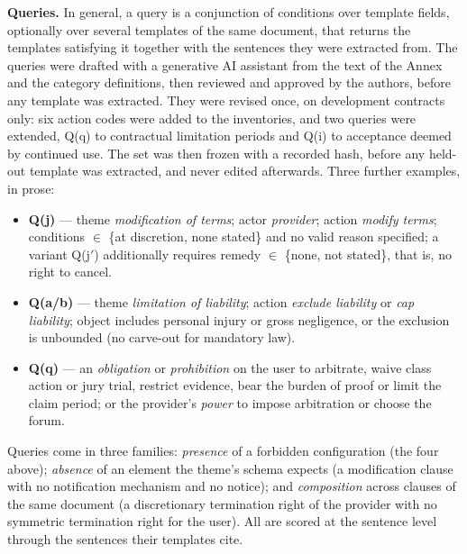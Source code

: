 \textbf{Queries.} In general, a query is a conjunction of conditions over template fields, optionally over several templates of the same document, that returns the templates satisfying it together with the sentences they were extracted from. The queries were drafted with a generative AI assistant from the text of the Annex and the \corpus{} category definitions, then reviewed and approved by the authors, before any template was extracted. They were revised once, on development contracts only: six action codes were added to the inventories, and two queries were extended, Q(q) to contractual limitation periods and Q(i) to acceptance deemed by continued use. The set was then frozen with a recorded hash, before any held-out template was extracted, and never edited afterwards. Three further examples, in prose:

\begin{itemize}
\item \textbf{Q(j)} --- theme \emph{modification of terms}; actor \emph{provider}; action \emph{modify terms}; conditions $\in$ \{at discretion, none stated\} and no valid reason specified; a variant Q(j$'$) additionally requires remedy $\in$ \{none, not stated\}, that is, no right to cancel.
\item \textbf{Q(a/b)} --- theme \emph{limitation of liability}; action \emph{exclude liability} or \emph{cap liability}; object includes personal injury or gross negligence, or the exclusion is unbounded (no carve-out for mandatory law).
\item \textbf{Q(q)} --- an \emph{obligation} or \emph{prohibition} on the user to arbitrate, waive class action or jury trial, restrict evidence, bear the burden of proof or limit the claim period; or the provider's \emph{power} to impose arbitration or choose the forum.
\end{itemize}

Queries come in three families: \emph{presence} of a forbidden configuration (the four above); \emph{absence} of an element the theme's schema expects (a modification clause with no notification mechanism and no notice); and \emph{composition} across clauses of the same document (a discretionary termination right of the provider with no symmetric termination right for the user). All are scored at the sentence level through the sentences their templates cite.
